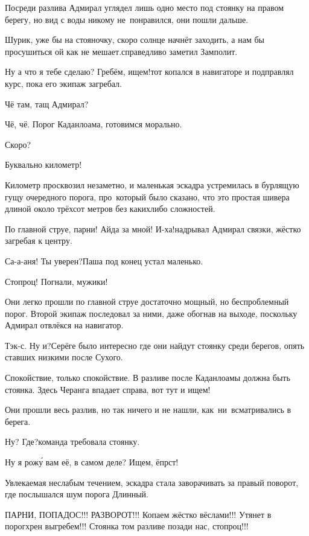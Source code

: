 Посреди разлива Адмирал углядел лишь одно место под стоянку на правом берегу, но вид с воды никому не~понравился, они пошли дальше.

\diagdash Шурик, уже бы на стояночку, скоро солнце начнёт заходить, а нам бы просушиться ой как не мешает.\mdash справедливо заметил Замполит.

\diagdash Ну а что я тебе сделаю? Гребём, ищем!\mdash тот копался в навигаторе и подправлял курс, пока его экипаж загребал.

\diagdash Чё там, тащ Адмирал?

\diagdash Чё, чё. Порог Каданлоама, готовимся морально.

\diagdash Скоро? 

\diagdash Буквально километр!

Километр просквозил незаметно, и маленькая эскадра устремилась в бурлящую гущу очередного порога, про~который было сказано, что это простая шивера длиной около трёхсот метров без каких\sdash либо сложностей.

\diagdash По главной струе, парни! Айда за мной! И-ха!\mdash надрывал Адмирал связки, жёстко загребая к центру.

\diagdash Са-а-аня! Ты уверен?\mdash Паша под конец устал маленько.

\diagdash Стопроц! Погнали, мужики!

Они легко прошли по главной струе достаточно мощный, но беспроблемный порог. Второй экипаж последовал за ними, даже обогнав на выходе, поскольку Адмирал отвлёкся на навигатор.

\diagdash Тэк-с. Ну и?\mdash Серёге было интересно где они найдут стоянку среди берегов, опять ставших низкими после Сухого.

\diagdash Спокойствие, только спокойствие. В разливе после Каданлоамы должна быть стоянка. Здесь Черанга впадает справа, вот тут и ищем!

Они прошли весь разлив, но так ничего и не нашли, как~ни~всматривались в берега.

\diagdash Ну? Где?\mdash команда требовала стоянку.

\diagdash Ну я рож\'{у} вам её, в самом деле? Ищем, ёпрст! 

Увлекаемая неслабым течением, эскадра стала заворачивать за правый поворот, где послышался шум порога Длинный.

\diagdash ПАРНИ, ПОПАДОС!!! РАЗВОРОТ!!! Копаем жёстко вёслами!!! Утянет в порог\mdash хрен выгребем!!! Стоянка том разливе позади нас, стопроц!!!

